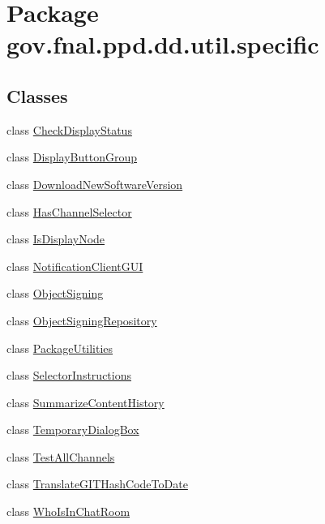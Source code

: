 \hypertarget{namespacegov_1_1fnal_1_1ppd_1_1dd_1_1util_1_1specific}{\section{Package gov.\-fnal.\-ppd.\-dd.\-util.\-specific}
\label{namespacegov_1_1fnal_1_1ppd_1_1dd_1_1util_1_1specific}
}
\subsection*{Classes}
\begin{DoxyCompactItemize}
\item 
class \hyperlink{classgov_1_1fnal_1_1ppd_1_1dd_1_1util_1_1specific_1_1CheckDisplayStatus}{Check\-Display\-Status}
\item 
class \hyperlink{classgov_1_1fnal_1_1ppd_1_1dd_1_1util_1_1specific_1_1DisplayButtonGroup}{Display\-Button\-Group}
\item 
class \hyperlink{classgov_1_1fnal_1_1ppd_1_1dd_1_1util_1_1specific_1_1DownloadNewSoftwareVersion}{Download\-New\-Software\-Version}
\item 
class \hyperlink{classgov_1_1fnal_1_1ppd_1_1dd_1_1util_1_1specific_1_1HasChannelSelector}{Has\-Channel\-Selector}
\item 
class \hyperlink{classgov_1_1fnal_1_1ppd_1_1dd_1_1util_1_1specific_1_1IsDisplayNode}{Is\-Display\-Node}
\item 
class \hyperlink{classgov_1_1fnal_1_1ppd_1_1dd_1_1util_1_1specific_1_1NotificationClientGUI}{Notification\-Client\-G\-U\-I}
\item 
class \hyperlink{classgov_1_1fnal_1_1ppd_1_1dd_1_1util_1_1specific_1_1ObjectSigning}{Object\-Signing}
\item 
class \hyperlink{classgov_1_1fnal_1_1ppd_1_1dd_1_1util_1_1specific_1_1ObjectSigningRepository}{Object\-Signing\-Repository}
\item 
class \hyperlink{classgov_1_1fnal_1_1ppd_1_1dd_1_1util_1_1specific_1_1PackageUtilities}{Package\-Utilities}
\item 
class \hyperlink{classgov_1_1fnal_1_1ppd_1_1dd_1_1util_1_1specific_1_1SelectorInstructions}{Selector\-Instructions}
\item 
class \hyperlink{classgov_1_1fnal_1_1ppd_1_1dd_1_1util_1_1specific_1_1SummarizeContentHistory}{Summarize\-Content\-History}
\item 
class \hyperlink{classgov_1_1fnal_1_1ppd_1_1dd_1_1util_1_1specific_1_1TemporaryDialogBox}{Temporary\-Dialog\-Box}
\item 
class \hyperlink{classgov_1_1fnal_1_1ppd_1_1dd_1_1util_1_1specific_1_1TestAllChannels}{Test\-All\-Channels}
\item 
class \hyperlink{classgov_1_1fnal_1_1ppd_1_1dd_1_1util_1_1specific_1_1TranslateGITHashCodeToDate}{Translate\-G\-I\-T\-Hash\-Code\-To\-Date}
\item 
class \hyperlink{classgov_1_1fnal_1_1ppd_1_1dd_1_1util_1_1specific_1_1WhoIsInChatRoom}{Who\-Is\-In\-Chat\-Room}
\end{DoxyCompactItemize}


